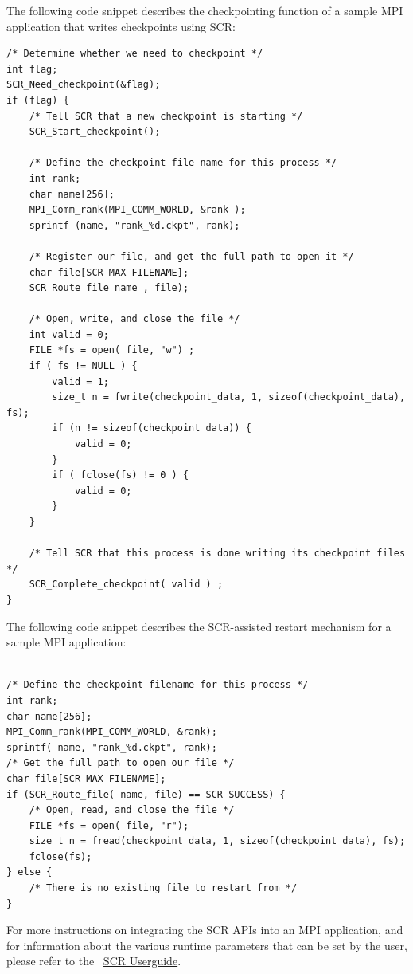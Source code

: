 The following code snippet describes the checkpointing function of a sample MPI
application that writes checkpoints using SCR:

\begin{verbatim}
/* Determine whether we need to checkpoint */
int flag;
SCR_Need_checkpoint(&flag);
if (flag) {
    /* Tell SCR that a new checkpoint is starting */
    SCR_Start_checkpoint();

    /* Define the checkpoint file name for this process */
    int rank;
    char name[256];
    MPI_Comm_rank(MPI_COMM_WORLD, &rank );
    sprintf (name, "rank_%d.ckpt", rank);

    /* Register our file, and get the full path to open it */
    char file[SCR MAX FILENAME];
    SCR_Route_file name , file);

    /* Open, write, and close the file */
    int valid = 0;
    FILE *fs = open( file, "w") ;
    if ( fs != NULL ) {
        valid = 1;
        size_t n = fwrite(checkpoint_data, 1, sizeof(checkpoint_data), fs);
        if (n != sizeof(checkpoint data)) {
            valid = 0;
        }
        if ( fclose(fs) != 0 ) {
            valid = 0;
        }
    }

    /* Tell SCR that this process is done writing its checkpoint files */
    SCR_Complete_checkpoint( valid ) ;
}
\end{verbatim}


The following code snippet describes the SCR-assisted restart mechanism for a
sample MPI application:

\begin{verbatim}

/* Define the checkpoint filename for this process */
int rank;
char name[256];
MPI_Comm_rank(MPI_COMM_WORLD, &rank);
sprintf( name, "rank_%d.ckpt", rank);
/* Get the full path to open our file */
char file[SCR_MAX_FILENAME];
if (SCR_Route_file( name, file) == SCR SUCCESS) {
    /* Open, read, and close the file */
    FILE *fs = open( file, "r");
    size_t n = fread(checkpoint_data, 1, sizeof(checkpoint_data), fs);
    fclose(fs);
} else {
    /* There is no existing file to restart from */
}

\end{verbatim}


For more instructions on integrating the SCR APIs into an MPI
application, and for information about the various runtime parameters that can
be set by the user, please refer to the
~\href{http://sourceforge.net/p/scalablecr/code/ci/b26dc6ec2310a694e3b7a0a4f85a9e2e26ee21fb/tree/doc/scr_users_manual.pdf?format=raw}{SCR
Userguide}.

